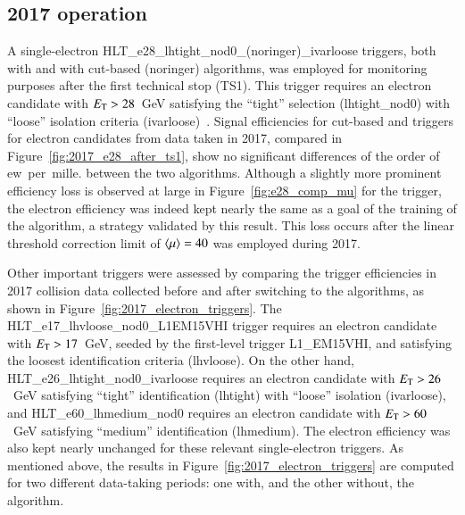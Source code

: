 \subsection{2017 operation}\label{ssec:2017_ringer_operation}

A single-electron HLT\_e28\_lhtight\_nod0\_(noringer)\_ivarloose triggers, both
 with \rnn{} and with cut-based (noringer) algorithms, was employed for monitoring purposes after the first technical stop (TS1).
This trigger requires an electron candidate with $E_{\text{T}} > 28$~GeV satisfying the \enquote{tight} selection (lhtight\_nod0) with \enquote{loose} isolation criteria (ivarloose)~\cite{TRIG-2018-05}. 
Signal efficiencies for cut-based and \rnn{} triggers for \tnp{} electron candidates from data taken in 2017, compared in Figure~\ref{fig:2017_e28_after_ts1}, show no significant differences of the order of ew~per~mille.  between the two algorithms.
Although a slightly more prominent efficiency loss is observed at large \avgmu{} in Figure~\ref{fig:e28_comp_mu} for the \rnn{} trigger, the electron efficiency was indeed kept nearly the same as a goal of the training of the \rnn algorithm, a strategy validated by this result.
This loss occurs after the linear threshold correction limit of $\langle \mu \rangle=40$ was employed during 2017.

Other important triggers were assessed by comparing the trigger efficiencies in 2017 collision data collected before and after switching to the \rnn{} algorithms, as shown in Figure~\ref{fig:2017_electron_triggers}. The HLT\_e17\_lhvloose\_nod0\_L1EM15VHI trigger requires an electron candidate with $E_{\text{T}} > 17$~GeV, seeded by the first-level trigger L1\_EM15VHI, and satisfying the loosest identification criteria (lhvloose). On the other hand, HLT\_e26\_lhtight\_nod0\_ivarloose requires an electron candidate with $E_{\text{T}}>26$~GeV satisfying \enquote{tight} identification (lhtight) with \enquote{loose} isolation (ivarloose), and HLT\_e60\_lhmedium\_nod0 requires an electron candidate with $E_{\text{T}}>60$~GeV satisfying \enquote{medium} identification (lhmedium). The electron efficiency was also kept nearly unchanged for these relevant single-electron triggers. As mentioned above, the results in Figure~\ref{fig:2017_electron_triggers} are computed for two different data-taking periods: one with, and the other without, the \rnn{} algorithm. 




